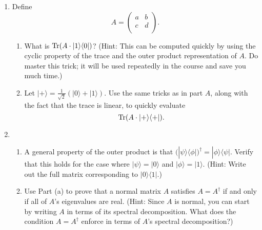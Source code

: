 \documentclass{article}
\newcommand{\bra}[1]{\langle #1|}
\newcommand{\ket}[1]{|#1\rangle}
\newcommand{\ketbra}[2]{\ket{#1}{\bra{#2}}}
\newcommand{\trace}{{\rm Tr}}
\begin{document}
\begin{enumerate}
  \item %
        Define
        \[
          A=\left(
          \begin{array}{cc}
              a & b \\
              c & d \\
            \end{array}
          \right).
        \]
        \begin{enumerate}
          \item %
                What is $\trace(A\cdot \ketbra{1}{0})$? (Hint: This can be computed quickly by using the cyclic property of the trace and the outer product representation of $A$. Do master this trick; it will be used repeatedly in the course and save you much time.)
          \item %
                Let $\ket{+}=\frac{1}{\sqrt{2}}(\ket{0}+\ket{1})$. Use the same tricks as in part $A$, along with the fact that the trace is linear, to quickly evaluate
                \[
                  \trace(A\cdot\ketbra{+}{+}).
                \]
        \end{enumerate}
  \item %
        \begin{enumerate}
          \item %
                A general property of the outer product is that $(\ketbra{\psi}{\phi})^\dagger=\ketbra{\phi}{\psi}$. Verify that this holds for the case where $\ket{\psi}=\ket{0}$ and $\ket{\phi}=\ket{1}$. (Hint: Write out the full matrix corresponding to $\ketbra{0}{1}$.)
          \item %
                Use Part (a) to prove that a normal matrix $A$ satisfies $A=A^\dagger$ if and only if all of $A$'s eigenvalues are real. (Hint: Since $A$ is normal, you can start by writing $A$ in terms of its spectral decomposition. What does the condition $A=A^\dagger$ enforce in terms of $A$'s spectral decomposition?)
        \end{enumerate}

\end{enumerate}
\end{document}
